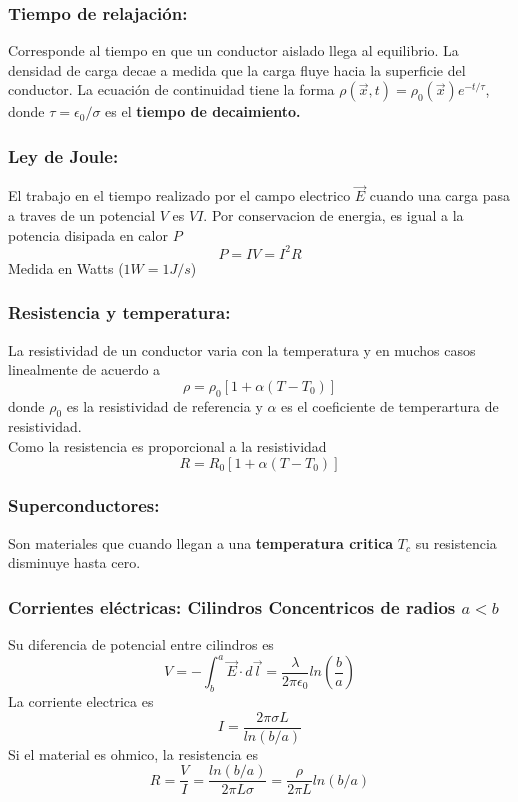 \documentclass[a4paper, 10pt]{article}
\begin{document}
\begin{multicols*}{2}
	\subsubsection{Tiempo de relajación:} Corresponde al tiempo en que un conductor aislado llega al equilibrio. La densidad de carga decae a medida que la carga fluye hacia la superficie del conductor.
	La ecuación de continuidad tiene la forma $\rho(\vec{x}, t) = \rho_0(\vec{x})e^{-t/\tau}$, donde $\tau =\epsilon_0/\sigma$ es el \textbf{tiempo de decaimiento.}\\
	    
	\subsubsection{Ley de Joule: }El trabajo en el tiempo realizado por el campo electrico $\vec{E}$ cuando una carga pasa a traves de un potencial $V$ es $VI$. Por conservacion de energia, es igual a la potencia disipada en calor $P$
	$$P = I V = I^2 R$$
	Medida en Watts ($1 W = 1 J/s$)
	    
	\subsubsection{Resistencia y temperatura: }La resistividad de un conductor varia con la temperatura y en muchos casos linealmente de acuerdo a $$\rho = \rho_0 [1+\alpha (T-T_0)]$$
	donde $\rho_0$ es la resistividad de referencia y $\alpha$ es el coeficiente de temperartura de resistividad.\\
	Como la resistencia es proporcional a la resistividad
	$$R=R_0[1+\alpha(T-T_0)]$$
	    
	\subsubsection{Superconductores:}
  Son materiales que cuando llegan a una \textbf{temperatura critica} $T_c$ su resistencia disminuye hasta cero.
	    
	\subsubsection{Corrientes eléctricas: Cilindros Concentricos de radios $a<b$}
	Su diferencia de potencial entre cilindros es $$V=-\int_b^a\vec{E}\cdot d\vec{l}=\frac{\lambda}{2 \pi \epsilon_0}ln(\frac{b}{a})$$
	La corriente electrica es 
	$$I=\frac{2\pi \sigma L}{ln(b/a)}$$
	Si el material es ohmico, la resistencia es
	$$R=\frac{V}{I}=\frac{ln(b/a)}{2\pi L \sigma}=\frac{\rho}{2 \pi L}ln(b/a)$$
	    

\end{multicols*}
\end{document}
